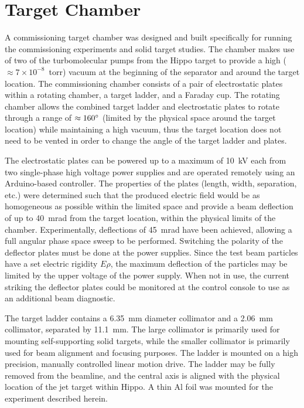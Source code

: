 \section{Target Chamber}
\label{sec:target}

A commissioning target chamber was designed and built specifically for
running the commissioning experiments and solid target studies. The
chamber makes use of two of the turbomolecular pumps from the Hippo
target to provide a high ($\approx 7\times 10^{-8}$~torr) vacuum at the
beginning of the separator and around the target location. The
commissioning chamber consists of a pair of electrostatic plates within
a rotating chamber, a target ladder, and a Faraday cup. The rotating
chamber allows the combined target ladder and electrostatic plates to
rotate through a range of $\approx 160\degree$ (limited by the physical
space around the target location) while maintaining a high vacuum, thus
the target location does not need to be vented in order to change the
angle of the target ladder and plates.

The electrostatic plates can be powered up to a maximum of 10~kV each
from two single-phase high voltage power supplies and are operated
remotely using an Arduino-based controller. The properties of the plates
(length, width, separation, etc.) were determined such that the produced
electric field would be as homogeneous as possible within the limited
space and provide a beam deflection of up to 40~mrad from the target
location, within the physical limits of the chamber. Experimentally,
deflections of 45~mrad have been achieved, allowing a full angular phase
space sweep to be performed. Switching the polarity of the deflector
plates must be done at the power supplies. Since the test beam particles
have a set electric rigidity $E\rho$, the maximum deflection of the
particles may be limited by the upper voltage of the power supply. When
not in use, the current striking the deflector plates could be monitored
at the control console to use as an additional beam diagnostic.

The target ladder contains a 6.35~mm diameter collimator and a 2.06~mm
collimator, separated by 11.1~mm. The large collimator is primarily used
for mounting self-supporting solid targets, while the smaller collimator
is primarily used for beam alignment and focusing purposes. The ladder
is mounted on a high precision, manually controlled linear motion drive.
The ladder may be fully removed from the beamline, and the central axis
is aligned with the physical location of the jet target within Hippo. A
thin Al foil was mounted for the experiment described herein.

